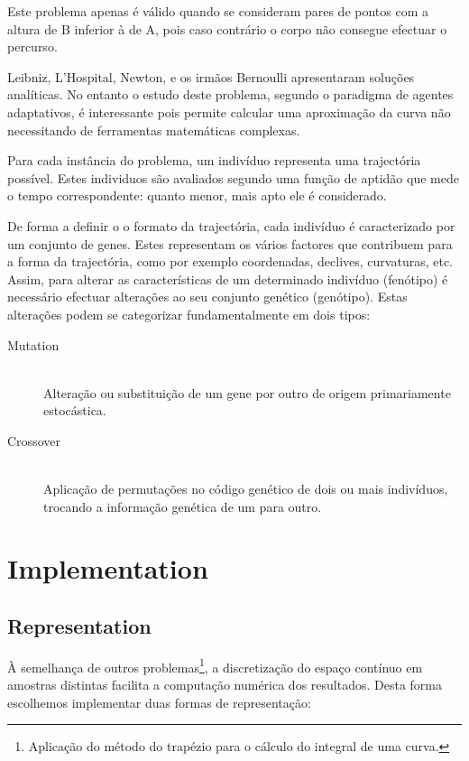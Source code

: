 \documentclass[a4paper]{article}
\begin{document}
\indent Este problema apenas é válido quando se consideram pares de pontos com a altura de B inferior à de A, pois caso contrário o corpo não consegue efectuar o percurso.

Leibniz, L'Hospital, Newton, e os irmãos Bernoulli apresentaram soluções analíticas.
No entanto o estudo deste problema, segundo o paradigma de agentes adaptativos, é interessante pois permite calcular uma aproximação da curva
não necessitando de ferramentas matemáticas complexas.

\indent Para cada instância do problema, um indivíduo representa uma trajectória possível. Estes individuos são avaliados segundo uma
função de aptidão que mede o tempo correspondente: quanto menor, mais apto ele é considerado.

\indent De forma a definir o o formato da trajectória, cada indivíduo é caracterizado por um conjunto de genes. Estes representam os vários
factores que contribuem para a forma da trajectória, como por exemplo coordenadas, declives, curvaturas, etc. Assim, para alterar as características
de um determinado indivíduo (fenótipo) é necessário efectuar alterações ao seu conjunto genético (genótipo). Estas alterações podem se categorizar
fundamentalmente em dois tipos:

\begin{description}
	\item[Mutation] \hfill \\ 
		Alteração ou substituição de um gene por outro de origem primariamente estocástica.
	\item[Crossover] \hfill \\ 
		Aplicação de permutações no código genético de dois ou mais indivíduos, trocando a informação genética de um para outro.
\end{description}

\cleardoublepage
\section{Implementation}

\subsection{Representation}
\indent \indent À semelhança de outros problemas\footnote[1]{Aplicação do método do trapézio para o cálculo do integral de uma curva.}, a discretização do espaço contínuo em amostras
distintas facilita a computação numérica dos resultados. Desta forma escolhemos implementar duas formas de representação:
\end{document}
